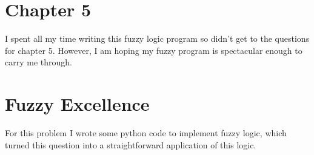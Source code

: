 \documentclass[12pt]{article}
\begin{document}
\maketitle

\section{Chapter 5}

I spent all my time writing this fuzzy logic program so didn't get to the questions for chapter 5.  However, I am hoping my fuzzy program is spectacular enough to carry me through.  

\section{Fuzzy Excellence}

For this problem I wrote some python code to implement fuzzy logic, which turned this question into a straightforward application of this logic.
\end{document}
